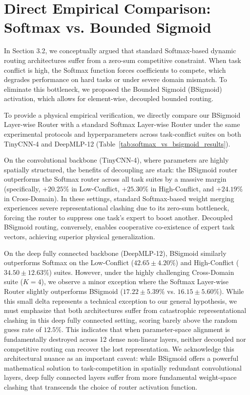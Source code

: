 \section{Direct Empirical Comparison: Softmax vs. Bounded Sigmoid}
\label{app:softmax_vs_bsigmoid}

In Section 3.2, we conceptually argued that standard Softmax-based dynamic routing architectures suffer from a zero-sum competitive constraint. When task conflict is high, the Softmax function forces coefficients to compete, which degrades performance on hard tasks or under severe domain mismatch. To eliminate this bottleneck, we proposed the Bounded Sigmoid (BSigmoid) activation, which allows for element-wise, decoupled bounded routing.

To provide a physical empirical verification, we directly compare our BSigmoid Layer-wise Router with a standard Softmax Layer-wise Router under the same experimental protocols and hyperparameters across task-conflict suites on both TinyCNN-4 and DeepMLP-12 (Table~\ref{tab:softmax_vs_bsigmoid_results}). 

On the convolutional backbone (TinyCNN-4), where parameters are highly spatially structured, the benefits of decoupling are stark: the BSigmoid router outperforms the Softmax router across all task suites by a massive margin (specifically, $+20.25\%$ in Low-Conflict, $+25.30\%$ in High-Conflict, and $+24.19\%$ in Cross-Domain). In these settings, standard Softmax-based weight merging experiences severe representational clashing due to its zero-sum bottleneck, forcing the router to suppress one task's expert to boost another. Decoupled BSigmoid routing, conversely, enables cooperative co-existence of expert task vectors, achieving superior physical generalization.

On the deep fully connected backbone (DeepMLP-12), BSigmoid similarly outperforms Softmax on the Low-Conflict ($42.65 \pm 4.20\%$) and High-Conflict ($34.50 \pm 12.63\%$) suites. However, under the highly challenging Cross-Domain suite ($K=4$), we observe a minor exception where the Softmax Layer-wise Router slightly outperforms BSigmoid ($17.22 \pm 5.39\%$ vs. $16.15 \pm 5.60\%$). While this small delta represents a technical exception to our general hypothesis, we must emphasize that both architectures suffer from catastrophic representational clashing in this deep fully connected setting, scoring barely above the random guess rate of $12.5\%$. This indicates that when parameter-space alignment is fundamentally destroyed across 12 dense non-linear layers, neither decoupled nor competitive routing can recover the lost representation. We acknowledge this architectural nuance as an important caveat: while BSigmoid offers a powerful mathematical solution to task-competition in spatially redundant convolutional layers, deep fully connected layers suffer from more fundamental weight-space clashing that transcends the choice of router activation function.

